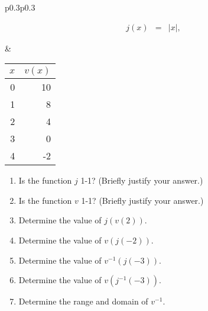 \begin{enumerate}
  \begin{tabular}{p{0.3\textwidth}p{0.3\textwidth}}
    \begin{minipage}{0.3\linewidth}
      \begin{eqnarray*}
        j(x) & = & |x|,
      \end{eqnarray*}
    \end{minipage}
    &
      \begin{minipage}{0.3\linewidth}
        \begin{tabular}{r|r}
          $x$ & $v(x)$ \\ \hline
          0 & 10 \\
          1 &  8 \\
          2 &  4 \\
          3 &  0 \\
          4 & -2
        \end{tabular}
      \end{minipage}
  \end{tabular}

  \begin{enumerate}
  \item  Is the function $j$ 1-1? (Briefly justify your answer.)
  \item  Is the function $v$ 1-1? (Briefly justify your answer.)
  \item  Determine the value of $j(v(2))$.
  \item  Determine the value of  $v(j(-2))$.
  \item  Determine the value of $v^{-1}(j(-3))$.
  \item  Determine the value of $v(j^{-1}(-3))$.
  \item  Determine the range and domain of $v^{-1}$.
  \end{enumerate}


\end{enumerate}


